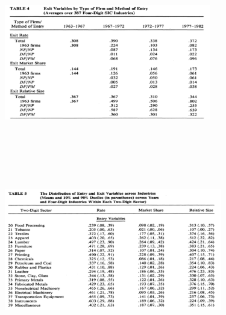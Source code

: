 \documentclass[dvipdfmx,14pt]{beamer}
\begin{document}
\begin{frame}

\begin{center}

\includegraphics[width=9cm,height=7.75cm]{DRS_T4.pdf}

\end{center}

\end{frame}

\begin{frame}

\begin{center}

\includegraphics[width=9.5cm,height=7.75cm]{DRS_T5a.pdf}

\end{center}

\end{frame}
\end{document}
